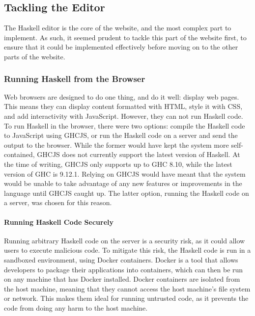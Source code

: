 \documentclass[../main.tex]{subfiles}
\begin{document}
        \subsection{Tackling the Editor}
            The Haskell editor is the core of the website, and the most complex part to
                implement.
            As such, it seemed prudent to tackle this part of the website first, to ensure
                that it could be implemented effectively before moving on to the other parts of
                the website.

            \subsubsection{Running Haskell from the Browser}
                Web browsers are designed to do one thing, and do it well: display web pages.
                This means they can display content formatted with HTML, style it with CSS, and
                    add interactivity with JavaScript.
                However, they can not run Haskell code.
                To run Haskell in the browser, there were two options: compile the Haskell code
                    to JavaScript using GHCJS, or run the Haskell code on a server and send the
                    output to the browser.
                While the former would have kept the system more self-contained, GHCJS does not
                    currently support the latest version of Haskell.
                At the time of writing, GHCJS only supports up to GHC 8.10, while the latest
                    version of GHC is 9.12.1.
                Relying on GHCJS would have meant that the system would be unable to take
                    advantage of any new features or improvements in the language until GHCJS
                    caught up.
                The latter option, running the Haskell code on a server, was chosen for this
                    reason.

                \paragraph{Running Haskell Code Securely}
                    Running arbitrary Haskell code on the server is a security risk, as it could
                        allow users to execute malicious code.
                    To mitigate this risk, the Haskell code is run in a sandboxed environment,
                        using Docker containers.
                    Docker is a tool that allows developers to package their applications into
                        containers, which can then be run on any machine that has Docker installed.
                    Docker containers are isolated from the host machine, meaning that they cannot
                        access the host machine's file system or network.
                    This makes them ideal for running untrusted code, as it prevents the code from
                        doing any harm to the host machine.
\end{document}
